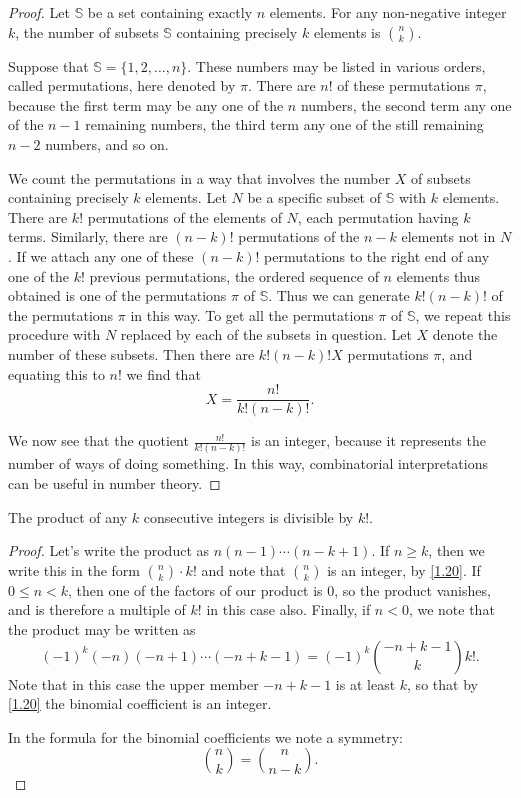 \documentclass[11pt]{article}
\begin{document}
\begin{proof}
	Let \(\mathbb{S}\) be a set containing exactly \(n\) elements. For any non-negative integer \(k\), the number of subsets \(\mathbb{S}\) containing precisely \(k\) elements is \(\binom{n}{k}\).

	Suppose that \(\mathbb{S} = \{1, 2, \ldots, n\}\). These numbers may be listed
	in various orders, called permutations, here denoted by \(\pi\). There are
	\(n!\) of these permutations \(\pi\), because the first term may be any one of
	the \(n\) numbers, the second term any one of the \(n - 1\) remaining numbers,
	the third term any one of the still remaining \(n - 2\) numbers, and so on.

	We count the permutations in a way that involves the number \(X\) of subsets
	containing precisely \(k\) elements. Let \(N\) be a specific subset of
	\(\mathbb{S}\) with \(k\) elements. There are \(k!\) permutations of the
	elements of \(N\), each permutation having \(k\) terms. Similarly, there are
	\((n - k)!\) permutations of the \(n - k\) elements not in \(N\). If we attach
	any one of these \((n - k)!\) permutations to the right end of any one of the
	\(k!\) previous permutations, the ordered sequence of \(n\) elements thus
	obtained is one of the permutations \(\pi\) of \(\mathbb{S}\). Thus we can
	generate \(k!(n - k)!\) of the permutations \(\pi\) in this way. To get all the
	permutations \(\pi\) of \(\mathbb{S}\), we repeat this procedure with \(N\)
	replaced by each of the subsets in question. Let \(X\) denote the number of
	these subsets. Then there are \(k!(n - k)!X\) permutations \(\pi\), and
	equating this to \(n!\) we find that
	\[
		X = \frac{n!}{k!(n - k)!}.
	\]

	We now see that the quotient \(\frac{n!}{k! (n - k)!}\) is an integer, because
	it represents the number of ways of doing something. In this way, combinatorial
	interpretations can be useful in number theory.
\end{proof}
\begin{theorem}\label{1.21}
	The product of any \(k\) consecutive integers is divisible by \(k!\).
\end{theorem}
\begin{proof}
	Let's write the product as \(n(n - 1) \cdots (n - k + 1)\). If \(n \geq k\), then we write this in the form \(\binom{n}{k} \cdot k!\) and note that \(\binom{n}{k}\) is an integer, by \cref{1.20}. If \(0 \leq n < k\), then one of the factors of our product is 0, so the product vanishes, and is therefore a multiple of \(k!\) in this case also. Finally, if \(n < 0\), we note that the product may be written as
	\[
		(-1)^k (-n)(-n + 1) \cdots (-n + k - 1) = (-1)^k \binom{-n + k - 1}{k} k!.
	\]
	Note that in this case the upper member \(-n + k - 1\) is at least \(k\), so
	that by \cref{1.20} the binomial coefficient is an integer.

	In the formula for the binomial coefficients we note a symmetry:
	\[
		\binom{n}{k} = \binom{n}{n - k}.
	\]
\end{proof}
\end{document}
